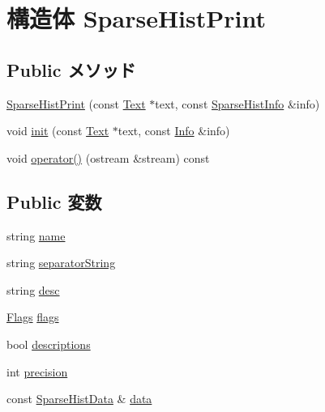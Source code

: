 \hypertarget{structStats_1_1SparseHistPrint}{
\section{構造体 SparseHistPrint}
\label{structStats_1_1SparseHistPrint}
}
\subsection*{Public メソッド}
\begin{DoxyCompactItemize}
\item 
\hyperlink{structStats_1_1SparseHistPrint_a04cfb81bcde7fdec680e3456ebcde82b}{SparseHistPrint} (const \hyperlink{classStats_1_1Text}{Text} $\ast$text, const \hyperlink{classStats_1_1SparseHistInfo}{SparseHistInfo} \&info)
\item 
void \hyperlink{structStats_1_1SparseHistPrint_a5c205569f811ccef04fc7ddaf47e3add}{init} (const \hyperlink{classStats_1_1Text}{Text} $\ast$text, const \hyperlink{classStats_1_1Info}{Info} \&info)
\item 
void \hyperlink{structStats_1_1SparseHistPrint_ab796867ec17c9aaf14b8e44923fc17e4}{operator()} (ostream \&stream) const 
\end{DoxyCompactItemize}
\subsection*{Public 変数}
\begin{DoxyCompactItemize}
\item 
string \hyperlink{structStats_1_1SparseHistPrint_a8ccf841cb59e451791bcb2e1ac4f1edc}{name}
\item 
string \hyperlink{structStats_1_1SparseHistPrint_ae18f266d1f96dc3dc8b179e00cf6c6f1}{separatorString}
\item 
string \hyperlink{structStats_1_1SparseHistPrint_acc6fde76f2c440ef4a9f7dc3765038b5}{desc}
\item 
\hyperlink{classFlags}{Flags} \hyperlink{structStats_1_1SparseHistPrint_aa991e2b209ef26272bf4fd920777bcda}{flags}
\item 
bool \hyperlink{structStats_1_1SparseHistPrint_ada0eec8923acca0939a06f40c6a88af8}{descriptions}
\item 
int \hyperlink{structStats_1_1SparseHistPrint_aa95455ed52a8459fad69509a4a0411b5}{precision}
\item 
const \hyperlink{structStats_1_1SparseHistData}{SparseHistData} \& \hyperlink{structStats_1_1SparseHistPrint_a9b090a39883ae5dec719f9fe3a85a341}{data}
\end{DoxyCompactItemize}


